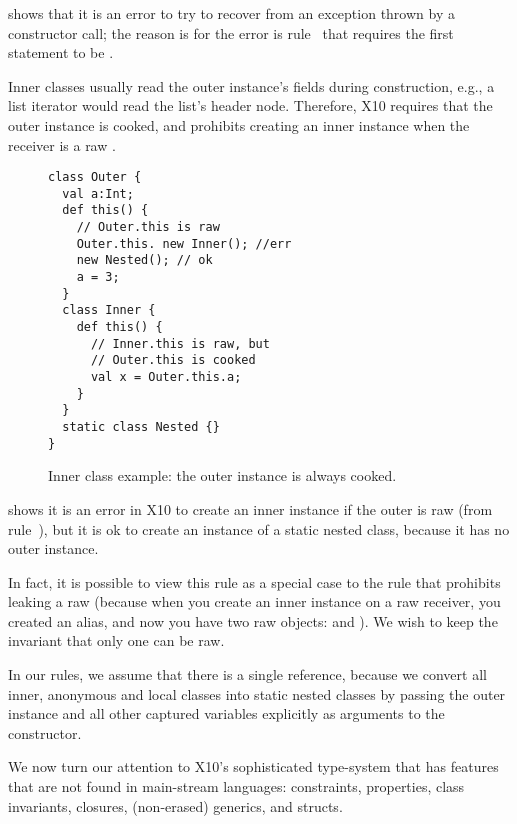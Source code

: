  shows that it is an error to try to recover from an exception thrown
    by a constructor call;
    the reason is for the error is rule~ that requires the first statement to be .


Inner classes usually read the outer instance's fields during construction,
    e.g., a list iterator would read the list's header node.
Therefore, X10 requires that the outer instance is cooked,
    and prohibits creating an inner instance when the receiver is a raw \this.


\begin{figure}
\begin{lstlisting}
class Outer {
  val a:Int;
  def this() {
    // Outer.this is raw
    Outer.this. new Inner(); //err
    new Nested(); // ok
    a = 3;
  }
  class Inner {
    def this() {
      // Inner.this is raw, but
      // Outer.this is cooked
      val x = Outer.this.a;
    }
  }
  static class Nested {}
}
\end{lstlisting}
\caption{Inner class example: the outer instance is always cooked.
    }
\label{Figure:InnerClass}
\end{figure}

 shows it is an error in X10 to create an inner instance
    if the outer is raw (from rule~),
    but it is ok to create an instance of a static nested class,
    because it has no outer instance.

In fact, it is possible to view this rule as a special case to the rule that
    prohibits leaking a raw \this
    (because when you create an inner instance on a raw \this receiver,
    you created an alias,
    and now you have two raw objects:  and ).
We wish to keep the invariant that only one \this can be raw.

In our rules, we assume that there is a single \this reference,
    because we convert all inner, anonymous and local classes into
    static nested classes
    by passing the outer instance and all other captured variables
    explicitly as arguments to the constructor.






We now turn our attention to X10's sophisticated type-system
    that has features that are not found in main-stream languages:
    constraints, properties, class invariants, closures, (non-erased) generics, and structs.

